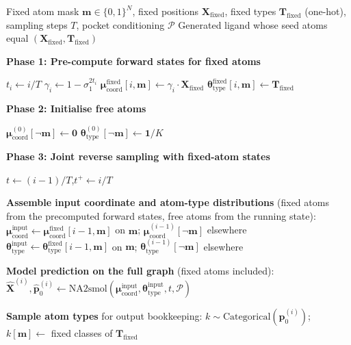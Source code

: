 \begin{algorithm}[H]
\caption{Seed-constrained inpainting sampling}
\label{alg:constrained}
\begin{algorithmic}[1]
\Require Fixed atom mask $\mathbf{m} \in \{0,1\}^N$, fixed positions $\mathbf{X}_{\text{fixed}}$, fixed types $\mathbf{T}_{\text{fixed}}$ (one-hot), sampling steps $T$, pocket conditioning $\mathcal{P}$
\Ensure Generated ligand whose seed atoms equal $(\mathbf{X}_{\text{fixed}}, \mathbf{T}_{\text{fixed}})$

\Statex \textbf{Phase 1: Pre-compute forward states for fixed atoms}

    \State $t_i \gets i / T$
    \State $\gamma_i \gets 1 - \sigma_1^{2t_i}$
    \State $\boldsymbol{\mu}_{\text{coord}}^{\text{fixed}}[i, \mathbf{m}] \gets \gamma_i \cdot \mathbf{X}_{\text{fixed}}$
    \State $\boldsymbol{\theta}_{\text{type}}^{\text{fixed}}[i, \mathbf{m}] \gets \mathbf{T}_{\text{fixed}}$
\EndFor

\Statex \textbf{Phase 2: Initialise free atoms}

\State $\boldsymbol{\mu}_{\text{coord}}^{(0)}[\neg \mathbf{m}] \gets \mathbf{0}$
\State $\boldsymbol{\theta}_{\text{type}}^{(0)}[\neg \mathbf{m}] \gets \mathbf{1}/K$

\Statex \textbf{Phase 3: Joint reverse sampling with fixed-atom states}

    \State $t \gets (i-1) / T$,\quad $t^{+} \gets i / T$

    \State \textbf{Assemble input coordinate and atom-type distributions} (fixed atoms from the precomputed forward states, free atoms from the running state):
    \State $\boldsymbol{\mu}_{\text{coord}}^{\text{input}} \gets \boldsymbol{\mu}_{\text{coord}}^{\text{fixed}}[i-1, \mathbf{m}]$ on $\mathbf{m}$; $\boldsymbol{\mu}_{\text{coord}}^{(i-1)}[\neg \mathbf{m}]$ elsewhere
    \State $\boldsymbol{\theta}_{\text{type}}^{\text{input}} \gets \boldsymbol{\theta}_{\text{type}}^{\text{fixed}}[i-1, \mathbf{m}]$ on $\mathbf{m}$; $\boldsymbol{\theta}_{\text{type}}^{(i-1)}[\neg \mathbf{m}]$ elsewhere

    \State \textbf{Model prediction on the full graph} (fixed atoms included):
    \State $\hat{\mathbf{X}}^{(i)}, \hat{\mathbf{p}}_0^{(i)} \gets \text{NA2smol}(\boldsymbol{\mu}_{\text{coord}}^{\text{input}}, \boldsymbol{\theta}_{\text{type}}^{\text{input}}, t, \mathcal{P})$

    \State \textbf{Sample atom types} for output bookkeeping:
    \State $k \sim \mathrm{Categorical}(\hat{\mathbf{p}}_0^{(i)})$;\quad $k[\mathbf{m}] \gets$ fixed classes of $\mathbf{T}_{\text{fixed}}$


\end{algorithmic}
\end{algorithm}
